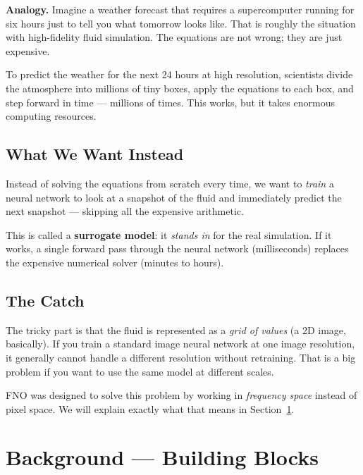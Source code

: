 \documentclass[11pt,twocolumn]{article}
\begin{document}
\begin{analogybox}
\textbf{Analogy.}
Imagine a weather forecast that requires a supercomputer running for six hours
just to tell you what tomorrow looks like.
That is roughly the situation with high-fidelity fluid simulation.
The equations are not wrong; they are just expensive.
\end{analogybox}

To predict the weather for the next 24 hours at high resolution, scientists
divide the atmosphere into millions of tiny boxes, apply the equations to each
box, and step forward in time --- millions of times.
This works, but it takes enormous computing resources.

\subsection{What We Want Instead}

Instead of solving the equations from scratch every time, we want to
\emph{train} a neural network to look at a snapshot of the fluid and
immediately predict the next snapshot --- skipping all the expensive arithmetic.

This is called a \textbf{surrogate model}: it \emph{stands in} for the real
simulation.
If it works, a single forward pass through the neural network (milliseconds)
replaces the expensive numerical solver (minutes to hours).

\subsection{The Catch}

The tricky part is that the fluid is represented as a \emph{grid of values}
(a 2D image, basically).
If you train a standard image neural network at one image resolution, it
generally cannot handle a different resolution without retraining.
That is a big problem if you want to use the same model at different scales.

FNO was designed to solve this problem by working in \emph{frequency space}
instead of pixel space.
We will explain exactly what that means in Section~\ref{sec:background}.

\section{Background --- Building Blocks}
\label{sec:background}
\end{document}
